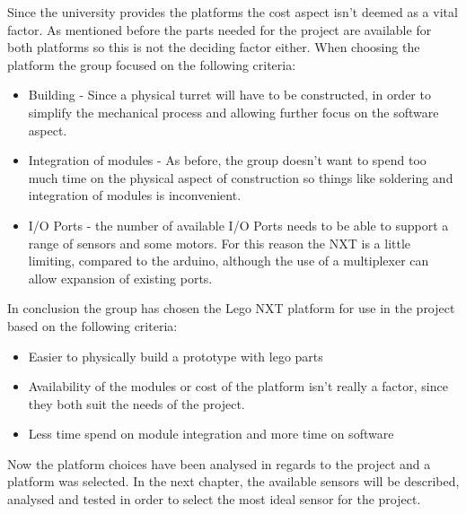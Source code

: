 Since the university provides the platforms the cost aspect isn't deemed as a vital factor. As mentioned before the parts needed for the project
are available for both platforms so this is not the deciding factor either. When choosing the platform the group focused on the following criteria:
\begin{itemize}

  \item Building - Since a physical turret will have to be constructed, in order to simplify the mechanical process and allowing further focus on the software aspect.
  \item Integration of modules - As before, the group doesn't want to spend too much time on the physical aspect of construction so things like soldering and integration of modules
is inconvenient.
  \item I/O Ports - the number of available I/O Ports needs to be able to support a range of sensors and some motors. For this reason the NXT is a little limiting, compared to the arduino, although the use of a multiplexer can allow expansion of existing ports.
\end{itemize}
In conclusion the group has chosen the Lego NXT platform for use in the project based on the following criteria:
\begin{itemize}
  \item Easier to physically build a prototype with lego parts
  \item Availability of the modules or cost of the platform isn't really a factor, since they both suit the needs of the project.
  \item Less time spend on module integration and more time on software
\end{itemize}

Now the platform choices have been analysed in regards to the project and a platform was selected. In the next chapter,
the available sensors will be described, analysed and tested in order to select the most ideal sensor for the project.
